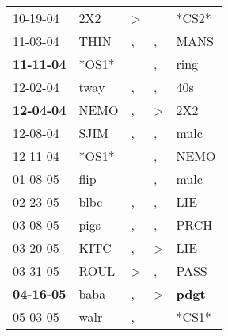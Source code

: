 \begin{supertabular}{p{0.07\textwidth}p{0.06\textwidth}p{0.02\textwidth}p{0.02\textwidth}p{0.06\textwidth}}
          10-19-04\textsuperscript{} &            2X2\textsuperscript{} &     \textgreater &                  &                            *CS2* \\
          11-03-04\textsuperscript{} &           THIN\textsuperscript{} &                , &                , &           MANS\textsuperscript{} \\
 \textbf{11-11-04\textsuperscript{}} &                            *OS1* &                  &                , &           ring\textsuperscript{} \\
          12-02-04\textsuperscript{} &           tway\textsuperscript{} &                , &                , &            40s\textsuperscript{} \\
 \textbf{12-04-04\textsuperscript{}} &           NEMO\textsuperscript{} &                , &     \textgreater &            2X2\textsuperscript{} \\
          12-08-04\textsuperscript{} &           SJIM\textsuperscript{} &                , &                , &           mulc\textsuperscript{} \\
          12-11-04\textsuperscript{} &                            *OS1* &                  &                , &           NEMO\textsuperscript{} \\
          01-08-05\textsuperscript{} &           flip\textsuperscript{} &                  &                , &           mulc\textsuperscript{} \\
          02-23-05\textsuperscript{} &           blbc\textsuperscript{} &                , &                , &            LIE\textsuperscript{} \\
          03-08-05\textsuperscript{} &           pigs\textsuperscript{} &                , &                , &           PRCH\textsuperscript{} \\
          03-20-05\textsuperscript{} &           KITC\textsuperscript{} &                , &     \textgreater &            LIE\textsuperscript{} \\
          03-31-05\textsuperscript{} &           ROUL\textsuperscript{} &     \textgreater &                , &           PASS\textsuperscript{} \\
 \textbf{04-16-05\textsuperscript{}} &           baba\textsuperscript{} &                , &     \textgreater &  \textbf{pdgt\textsuperscript{}} \\
          05-03-05\textsuperscript{} &           walr\textsuperscript{} &                , &                  &                            *CS1* \\

\end{supertabular}
